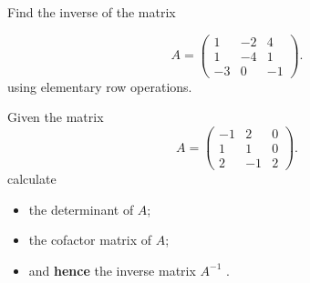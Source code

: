 \documentclass[12pt,a4paper]{article}
\begin{document}
 Find the inverse of the  matrix 

\begin{equation*}
A=\left( \begin{array}{rrr}
1 & -2 & 4\\
1 & -4 & 1\\
-3 & 0 & -1
\end{array} \right).
\end{equation*}
using elementary row operations.

 Given the  matrix 
\begin{equation*}
A=\left( \begin{array}{rrr}
-1 & 2 & 0\\
1 & 1 & 0\\
2 & -1 & 2
\end{array} \right).
\end{equation*}
calculate
\begin{itemize}
\item the determinant of $A$;
\item the cofactor matrix of $A$;
\item and {\bf hence} the inverse matrix $A^{-1}$ .
\end{itemize}
\end{document}
